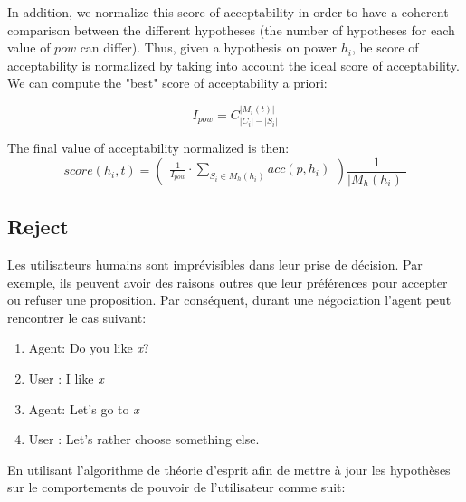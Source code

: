\documentclass[conference, letterpaper]{article}
\begin{document}
		In addition, we normalize this score of acceptability in order to have a coherent comparison between the different hypotheses (the number of hypotheses for each value of $pow$ can differ). Thus, given a hypothesis on power $h_i$, he score of acceptability is normalized by taking into account the ideal score of acceptability. We can compute the "best" score of acceptability a priori:
		
		$$I_{pow} = C_{|C_i|-|S_i|}^{|M_i(t)|}$$
		
		
		The final value of acceptability normalized is then:
		\begin{equation}
		score(h_i, t)= \left( \begin{array}{c}  \frac{1}{I_{pow}} \cdot \sum_{S_i \in M_h(h_i) } acc(p, h_i) 
		\end{array}\right) \frac{1}{| M_h(h_i)|}
		\end{equation}
		

	

		 \subsection{Reject}
			Les utilisateurs humains sont imprévisibles dans leur prise de décision. Par exemple, ils peuvent avoir des raisons outres que leur préférences pour accepter ou refuser une proposition. 
			Par conséquent, durant une négociation l'agent peut rencontrer le cas suivant:			
					\begin{enumerate}
					\item	Agent: Do you like \emph{x}?	
					\item	User : I like \emph{x}
					\item	Agent: Let's go to \emph{x}
					\item	User : Let's rather choose something else. 
					\end{enumerate}
					
			 
			En utilisant l'algorithme de théorie d'esprit afin de mettre à jour les hypothèses sur le comportements de pouvoir de l'utilisateur comme suit:
\end{document}
